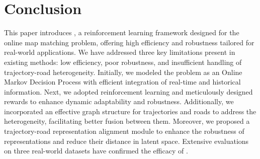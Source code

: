\section{Conclusion}
This paper introduces \textbf{\modelName}, a reinforcement learning framework designed for the online map matching problem, offering high efficiency and robustness tailored for real-world applications. We have addressed three key limitations present in existing methods: low efficiency, poor robustness, and insufficient handling of trajectory-road heterogeneity. Initially, we modeled the problem as an Online Markov Decision Process with efficient integration of real-time and historical information. Next, we adopted reinforcement learning and meticulously designed rewards to enhance dynamic adaptability and robustness. Additionally, we incorporated an effective graph structure for trajectories and roads to address the heterogeneity, facilitating better fusion between them. Moreover, we proposed a trajectory-road representation alignment module to enhance the robustness of representations and reduce their distance in latent space. Extensive evaluations on three real-world datasets have confirmed the efficacy of \textbf{\modelName}.
